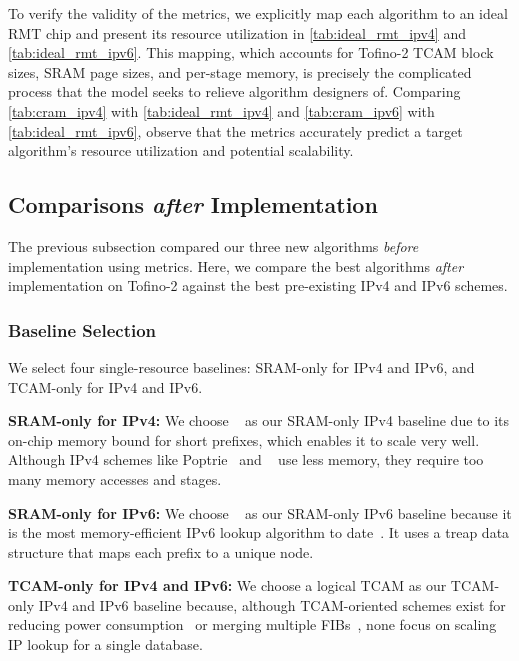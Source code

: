 To verify the validity of the \cram metrics, we explicitly map each \cram algorithm to an ideal RMT chip and present its resource utilization in \cref{tab:ideal_rmt_ipv4} and \cref{tab:ideal_rmt_ipv6}. This mapping, which accounts for Tofino-2 TCAM block sizes, SRAM page sizes, and per-stage memory, is precisely the complicated process that the \cram model seeks to relieve algorithm designers of. Comparing \cref{tab:cram_ipv4} with \cref{tab:ideal_rmt_ipv4} and \cref{tab:cram_ipv6} with \cref{tab:ideal_rmt_ipv6}, observe that the \cram metrics accurately predict a target algorithm's resource utilization and potential scalability.

\subsection{Comparisons {\em after} Implementation}
\label{subsec:after_implementation}

The previous subsection compared our three new algorithms {\em before} implementation using \cram metrics. Here, we compare the best \cram algorithms {\em after} implementation on Tofino-2 against the best pre-existing IPv4 and IPv6 schemes.

\subsubsection{Baseline Selection} \label{subsubsec:baselines}

We select four single-resource baselines: SRAM-only for IPv4 and IPv6, and TCAM-only for IPv4 and IPv6.

{\bf SRAM-only for IPv4:} We choose \sail~\cite{sail} as our SRAM-only IPv4 baseline due to its on-chip memory bound for short prefixes, which enables it to scale very well. Although IPv4 schemes like Poptrie~\cite{poptrie} and \dxr~\cite{dxr} use less memory, they require too many memory accesses and stages.

{\bf SRAM-only for IPv6:} We choose \hibst~\cite{hibst} as our SRAM-only IPv6 baseline because it is the most memory-efficient IPv6 lookup algorithm to date~\cite{xoroffsettrie}. It uses a treap data structure that maps each prefix to a unique node.

{\bf TCAM-only for IPv4 and IPv6:} We choose a logical TCAM as our TCAM-only IPv4 and IPv6 baseline because, although TCAM-oriented schemes exist for reducing power consumption~\cite{liu} or merging multiple FIBs~\cite{virtual_routers}, none focus on scaling IP lookup for a single database.

